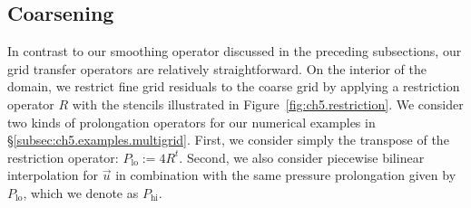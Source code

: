 \subsection{Coarsening}

In contrast to our smoothing operator discussed in the preceding subsections, our grid transfer operators are relatively straightforward. On the interior of the domain, we restrict fine grid residuals to the coarse grid by applying a restriction operator $R$ with the stencils illustrated in Figure~\ref{fig:ch5.restriction}. We consider two kinds of prolongation operators for our numerical examples in \S\ref{subsec:ch5.examples.multigrid}. First, we consider simply the transpose of the restriction operator: $P_{\text{lo}} := 4 R^t$. Second, we also consider piecewise bilinear interpolation for $\vec{u}$ in combination with the same pressure prolongation given by $P_{\text{lo}}$, which we denote as $P_{\text{hi}}$.

